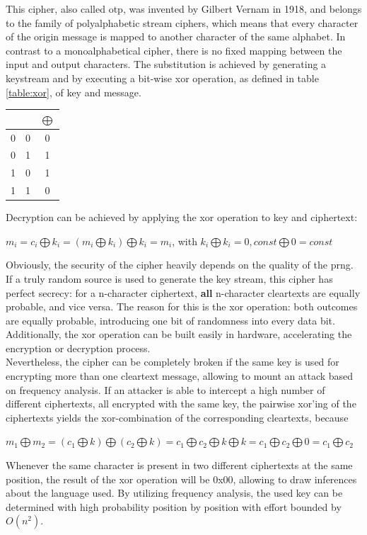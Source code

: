 This cipher, also called \gls{otp}, was invented by Gilbert Vernam in 1918, and belongs to the family of polyalphabetic stream ciphers,
which means that every character of the origin message is mapped to another character of the same alphabet. In contrast to a monoalphabetical cipher,
there is no fixed mapping between the input and output characters.
The substitution is achieved by generating a keystream and by executing 
a bit-wise \gls{xor} operation, as defined in table \ref{table:xor}, of key and message.
\begin{center}
\begin{tabular}{ c c | c }
 \label{table:xor}
   &  & $\bigoplus$ \\ \hline
  0 & 0 & 0 \\
  0 & 1 & 1 \\
  1 & 0 & 1 \\
  1 & 1 & 0 \\
\end{tabular}
\end{center}
Decryption can be achieved by applying the \gls{xor} operation to key and ciphertext:
\begin{center}
 $m_i = c_i \bigoplus k_i = (m_i \bigoplus k_i) \bigoplus k_i = m_i$, with $ k_i \bigoplus k_i = 0, const \bigoplus 0 = const$
\end{center}
Obviously, the security of the cipher heavily depends on the quality of the \gls{prng}. If a truly random source is used to generate the key stream, this cipher
has perfect secrecy: for a n-character ciphertext, \textbf{all} n-character cleartexts are equally probable, and vice versa. 
The reason for this is the \gls{xor} operation: both outcomes are equally probable, introducing one bit of randomness into every data bit. 
\\
Additionally, the \gls{xor} operation can be built easily in hardware, accelerating the encryption or decryption process.
\\
Nevertheless, the cipher can be completely broken if the same key is used for encrypting more than one cleartext message, allowing to mount
an attack based on frequency analysis.
If an attacker is able to intercept a high number of different ciphertexts, all encrypted with the same key, the pairwise xor'ing of the ciphertexts
yields the xor-combination of the corresponding cleartexts, because
\begin{center}
 $m_1 \bigoplus m_2 = (c_1 \bigoplus k) \bigoplus (c_2 \bigoplus k) = c_1 \bigoplus c_2 \bigoplus k \bigoplus k = c_1 \bigoplus c_2 \bigoplus 0 = c_1 \bigoplus c_2$
\end{center}
Whenever the same character is present in two different ciphertexts at the same position, the result of the \gls{xor} operation will be 0x00, allowing to draw
inferences about the language used. By utilizing frequency analysis, the used key can be determined with high probability position by position with effort bounded by $O(n^2)$.

